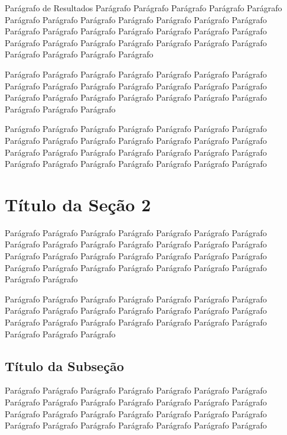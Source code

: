 Parágrafo de Resultados Parágrafo Parágrafo Parágrafo Parágrafo Parágrafo Parágrafo Parágrafo Parágrafo Parágrafo Parágrafo Parágrafo Parágrafo Parágrafo Parágrafo Parágrafo Parágrafo Parágrafo Parágrafo Parágrafo Parágrafo Parágrafo Parágrafo Parágrafo Parágrafo Parágrafo Parágrafo Parágrafo Parágrafo Parágrafo Parágrafo 


Parágrafo Parágrafo Parágrafo Parágrafo Parágrafo Parágrafo Parágrafo Parágrafo Parágrafo Parágrafo Parágrafo Parágrafo Parágrafo Parágrafo Parágrafo Parágrafo Parágrafo Parágrafo Parágrafo Parágrafo Parágrafo Parágrafo Parágrafo Parágrafo 

Parágrafo Parágrafo Parágrafo Parágrafo Parágrafo Parágrafo Parágrafo Parágrafo Parágrafo Parágrafo Parágrafo Parágrafo Parágrafo Parágrafo Parágrafo Parágrafo Parágrafo Parágrafo Parágrafo Parágrafo Parágrafo Parágrafo Parágrafo Parágrafo Parágrafo Parágrafo Parágrafo Parágrafo 

\section{Título da Seção 2}

Parágrafo Parágrafo Parágrafo Parágrafo Parágrafo Parágrafo Parágrafo Parágrafo Parágrafo Parágrafo Parágrafo Parágrafo Parágrafo Parágrafo Parágrafo Parágrafo Parágrafo Parágrafo Parágrafo Parágrafo Parágrafo Parágrafo Parágrafo Parágrafo Parágrafo Parágrafo Parágrafo Parágrafo Parágrafo Parágrafo 

Parágrafo Parágrafo Parágrafo Parágrafo Parágrafo Parágrafo Parágrafo Parágrafo Parágrafo Parágrafo Parágrafo Parágrafo Parágrafo Parágrafo Parágrafo Parágrafo Parágrafo Parágrafo Parágrafo Parágrafo Parágrafo Parágrafo Parágrafo Parágrafo 

\subsection{Título da Subseção}
Parágrafo Parágrafo Parágrafo Parágrafo Parágrafo Parágrafo Parágrafo Parágrafo Parágrafo Parágrafo Parágrafo Parágrafo Parágrafo Parágrafo Parágrafo Parágrafo Parágrafo Parágrafo Parágrafo Parágrafo Parágrafo Parágrafo Parágrafo Parágrafo Parágrafo Parágrafo Parágrafo Parágrafo 